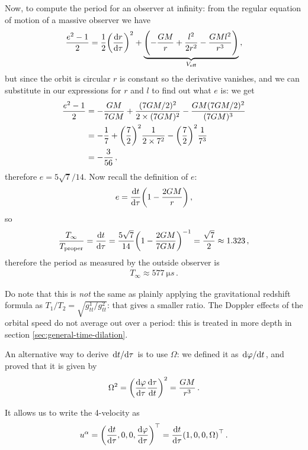 \documentclass[main.tex]{subfiles}
\begin{document}
Now, to compute the period for an observer at infinity: from the regular equation of motion of a massive observer we have 
%
\begin{align}
  \frac{e^2-1}{2} = \frac{1}{2} \qty(\dv{r}{\tau })^2+ \underbrace{\qty(-\frac{GM}{r} + \frac{l^2}{2r^2} - \frac{GMl^2}{r^3})}_{V _{\text{eff}}}
\,,
\end{align}
%
but since the orbit is circular \(r\) is constant so the derivative vanishes, and we can substitute in our expressions for \(r\) and \(l\) to find out what \(e\) is: we get 
%
\begin{subequations}
\begin{align}
  \frac{e^2-1}{2} &= - \frac{GM}{7GM} + \frac{(7GM/2)^2}{2\times (7GM)^2} - \frac{GM (7GM/2)^2}{(7GM)^3}  \\
&= - \frac{1}{7}+ \qty(\frac{7}{2})^2 \frac{1}{2\times 7^2} - \qty(\frac{7}{2})^2 \frac{1}{7^3}  \\
&= -\frac{3}{56}
\,,
\end{align}
\end{subequations}
%
therefore \(e = 5 \sqrt{7} / 14\). Now recall the definition of \(e\): 
%
\begin{align}
  e = \dv{t}{\tau } \qty(1 - \frac{2GM}{r}) 
\,,
\end{align}
%
so 
%
\begin{align}
  \frac{T_{ \infty }}{T _{\text{proper}}} = 
  \dv{t}{\tau } = \frac{5 \sqrt{7}}{14} \qty(1 - \frac{2GM}{7GM})^{-1} = \frac{\sqrt{7}}{2} \approx 1.323 
\,,
\end{align}
%
therefore the period as measured by the outside observer is 
%
\begin{align}
  T_{ \infty } \approx \SI{577}{\micro s}
\,.
\end{align}
%

Do note that this is \emph{not} the same as plainly applying the gravitational redshift formula as \(T_1 / T_2 = \sqrt{ g_{tt}^{1}/ g_{tt}^{2}}\): that gives a smaller ratio. The Doppler effects of the orbital speed do not average out over a period: this is treated in more depth in section \ref{sec:general-time-dilation}. 

An alternative way to derive \(\dv*{t}{\tau }\) is to use \(\Omega \): we defined it as \(\dv*{\varphi }{t}\), and proved that it is given by 
%
\begin{align}
  \Omega^2 = \qty(\dv{\varphi }{\tau } \dv{\tau }{t})^2
  = \frac{GM}{r^3}
\,.
\end{align}

It allows us to write the 4-velocity as 
%
\begin{align}
  u^{\alpha } = \qty(\dv{t}{\tau }, 0, 0, \dv{\varphi}{\tau })^{\top} = \dv{t}{\tau } \qty(1, 0, 0, \Omega )^{\top}
\,.
\end{align}
\end{document}
